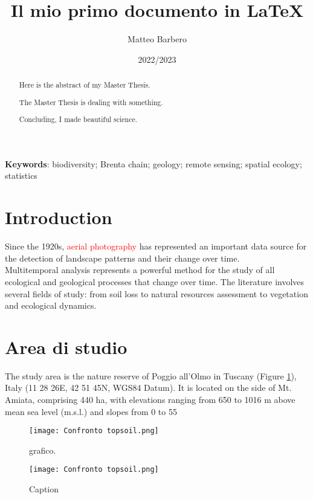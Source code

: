 \documentclass[a4paper,12pt]{article} %
\title{Il mio primo documento in LaTeX}
\author{Matteo Barbero}
\date{2022/2023} %
\begin{document}

\maketitle
\doublespacing
\tableofcontents

\begin{abstract}
Here is the abstract of my Master Thesis.

The Master Thesis is dealing with something.

Concluding, I made beautiful science.
\end{abstract}

\noindent \textbf{Keywords}: biodiversity; Brenta chain; geology; remote sensing; spatial ecology; statistics

\section{Introduction}\label{sec:intro}

Since the 1920s, \textcolor{red}{aerial photography} has represented an important data source for the detection of landscape patterns and their change over time. \\


Multitemporal analysis represents a powerful method for the study of all ecological and geological processes that change over time. The literature involves several fields of study: from soil loss to natural resources assessment to vegetation and ecological dynamics.

\section{Area di studio}

The study area is the nature reserve of Poggio all’Olmo in Tuscany (Figure \ref{fig:topsoil}), Italy (11 28 26E, 42 51 45N, WGS84 Datum). It is located on the side of Mt. Amiata,
comprising 440 ha, with elevations ranging from 650 to 1016 m above mean sea level (m.s.l.) and slopes from 0 to 55

\begin{figure}
\centering
\texttt{[image: Confronto topsoil.png]}
\caption{grafico.}
\label{fig:topsoil}
\end{figure}

\begin{figure}[h]
        \centering
        \texttt{[image: Confronto topsoil.png]}
        \caption{Caption}
        \label{fig:my_label}
\end{figure}
\end{document}
